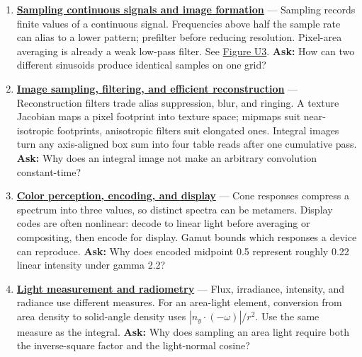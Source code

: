 \begin{enumerate}
\item
  \textbf{\href{Continuous\%20Notes/University\%20-\%20Worlds,\%20Images\%20and\%20Inference\%20-\%20Graphics,\%20Vision\%20and\%20Photography\#Sampling\%20continuous\%20signals\%20and\%20image\%20formation}{Sampling continuous signals and image formation}} --- Sampling records finite values of a continuous signal. Frequencies above half the sample rate can alias to a lower pattern; prefilter before reducing resolution. Pixel-area averaging is already a weak low-pass filter. See \href{Continuous\%20Notes/University\%20-\%20Worlds,\%20Images\%20and\%20Inference\%20-\%20Graphics,\%20Vision\%20and\%20Photography\#Figure\%20U3\%20-\%20Two\%20signals\%20can\%20share\%20the\%20same\%20samples}{Figure U3}. \textbf{Ask:} How can two different sinusoids produce identical samples on one grid?
\item
  \textbf{\href{Continuous\%20Notes/University\%20-\%20Worlds,\%20Images\%20and\%20Inference\%20-\%20Graphics,\%20Vision\%20and\%20Photography\#Image\%20sampling,\%20filtering,\%20and\%20efficient\%20reconstruction}{Image sampling, filtering, and efficient reconstruction}} --- Reconstruction filters trade alias suppression, blur, and ringing. A texture Jacobian maps a pixel footprint into texture space; mipmaps suit near-isotropic footprints, anisotropic filters suit elongated ones. Integral images turn any axis-aligned box sum into four table reads after one cumulative pass. \textbf{Ask:} Why does an integral image not make an arbitrary convolution constant-time?
\item
  \textbf{\href{Continuous\%20Notes/University\%20-\%20Worlds,\%20Images\%20and\%20Inference\%20-\%20Graphics,\%20Vision\%20and\%20Photography\#Color\%20perception,\%20encoding,\%20and\%20display}{Color perception, encoding, and display}} --- Cone responses compress a spectrum into three values, so distinct spectra can be metamers. Display codes are often nonlinear: decode to linear light before averaging or compositing, then encode for display. Gamut bounds which responses a device can reproduce. \textbf{Ask:} Why does encoded midpoint 0.5 represent roughly 0.22 linear intensity under gamma 2.2?
\item
  \textbf{\href{Continuous\%20Notes/University\%20-\%20Worlds,\%20Images\%20and\%20Inference\%20-\%20Graphics,\%20Vision\%20and\%20Photography\#Light\%20measurement\%20and\%20radiometry}{Light measurement and radiometry}} --- Flux, irradiance, intensity, and radiance use different measures. For an area-light element, conversion from area density to solid-angle density uses \(|n_y\cdot(-\omega)|/r^2\). Use the same measure as the integral. \textbf{Ask:} Why does sampling an area light require both the inverse-square factor and the light-normal cosine?

\end{enumerate}
